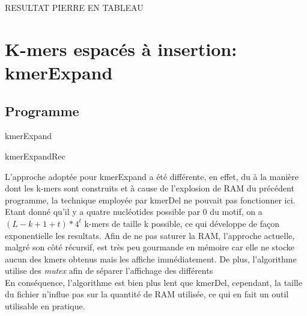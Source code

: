 \documentclass{report}
\begin{document}
      RESULTAT PIERRE EN TABLEAU
    \newpage
  \chapter{K-mers espacés à insertion: kmerExpand}
    \section{Programme}
      \normalsize
      \begin{algorithm}[H]{
        \caption{kmerExpand}
      }\end{algorithm}
      \begin{algorithm}[H]{
        \caption{kmerExpandRec}
      }\end{algorithm}
      \large
      L'approche adoptée pour kmerExpand a été différente, en effet, du à la manière dont les k-mers sont construits et à cause de l'explosion de RAM du précédent programme, la technique employée par kmerDel ne pouvait pas fonctionner ici.\\
      Etant donné qu'il y a quatre nucléotides possible par $0$ du motif, on a $(L - k + 1 + t)*4^t$ k-mers de taille k possible, ce qui développe de façon exponentielle les resultats. Afin de ne pas saturer la RAM, l'approche actuelle, malgré son côté récursif, est très peu gourmande en mémoire car elle ne stocke aucun des kmers obtenus mais les affiche immédiatement. De plus, l'algorithme utilise des \textit{mutex} afin de séparer l'affichage des différents \\
      En conséquence, l'algorithme est bien plus lent que kmerDel, cependant, la taille du fichier n'influe pas sur la quantité de RAM utilisée, ce qui en fait un outil utilisable en pratique.
\end{document}
